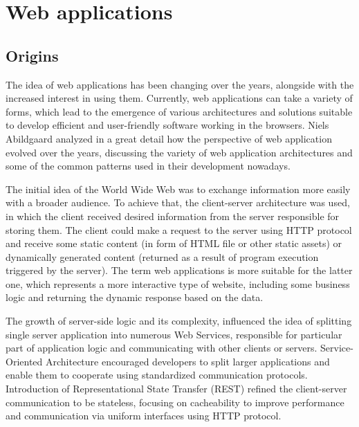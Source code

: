 \chapter{Web applications}


\section{Origins}

The idea of web applications has been changing over the years, alongside with the increased interest in using them. Currently, web applications can take a variety of forms, which lead to the emergence of various architectures and solutions suitable to develop efficient and user-friendly software working in the browsers. Niels Abildgaard \cite{PerspectivesOnArchitectureEvolution} analyzed in a great detail how the perspective of web application evolved over the years, discussing the variety of web application architectures and some of the common patterns used in their development nowadays.

The initial idea of the World Wide Web was to exchange information more easily with a broader audience. To achieve that, the client-server architecture was used, in which the client received desired information from the server responsible for storing them. The client could make a request to the server using HTTP protocol and receive some static content (in form of HTML file or other static assets) or dynamically generated content (returned as a result of program execution triggered by the server). The term web applications is more suitable for the latter one, which represents a more interactive type of website, including some business logic and returning the dynamic response based on the data.

The growth of server-side logic and its complexity, influenced the idea of splitting single server application into numerous Web Services, responsible for particular part of application logic and communicating with other clients or servers. Service-Oriented Architecture encouraged developers to split larger applications and enable them to cooperate using standardized communication protocols. Introduction of Representational State Transfer (REST) \cite{RESTPrincipledDesingOfModernWebArchitecture} refined the client-server communication to be stateless, focusing on cacheability to improve performance and communication via uniform  interfaces using HTTP protocol.

